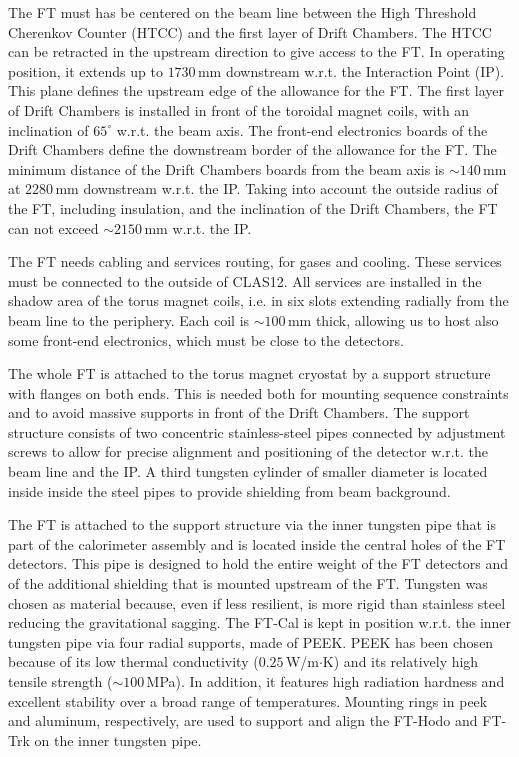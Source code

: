 The FT must has be centered on the beam line between the High Threshold Cherenkov Counter (HTCC) and the first layer of Drift Chambers. The HTCC can be retracted in the upstream direction to give access to the FT. In operating position, it extends up to $1730\,$mm downstream w.r.t. the Interaction Point (IP). This plane defines the upstream edge of the allowance for the FT. The first layer of Drift Chambers is installed in front of the toroidal magnet coils, with an inclination of $65^\circ$ w.r.t. the beam axis. The front-end electronics boards of the Drift Chambers define the downstream border of the allowance for the FT. The minimum distance of the Drift Chambers boards from the beam axis is $\sim140\,$mm at $2280\,$mm downstream w.r.t. the IP. Taking into account the outside radius of the FT, including insulation, and the inclination of the Drift Chambers, the FT can not exceed $\sim2150\,$mm w.r.t. the IP.

The FT needs cabling and services routing, for gases and cooling. These services must be connected to the outside of CLAS12. All services are installed in the shadow area of the torus magnet coils, i.e. in six slots extending radially from the beam line to the periphery. Each coil is  $\sim100\,$mm thick, allowing us to host also some front-end electronics, which must be close to the detectors.

The whole FT is attached to the torus magnet cryostat by a support structure with flanges on both ends. This is needed both for mounting sequence constraints and to avoid massive supports in front of the Drift Chambers.  The support structure consists of two concentric stainless-steel pipes connected by adjustment screws to allow for precise alignment and positioning of the detector w.r.t. the beam line and the IP. A third tungsten cylinder of smaller diameter is located inside inside the steel pipes to provide shielding from beam background. 

 The FT is attached to the support structure via the inner tungsten pipe that is part of the calorimeter assembly and is located inside the central holes of the FT detectors. This pipe is designed to hold the entire weight of the FT detectors and of the additional shielding that is mounted upstream of the FT. Tungsten was chosen as material because, even if less resilient, is more rigid than stainless steel reducing the gravitational sagging. The FT-Cal is kept in position w.r.t. the inner tungsten pipe via four radial supports, made of PEEK. PEEK has been chosen because of its low thermal conductivity ($0.25\,$W/m$\cdot$K) and its relatively high tensile strength ($\sim100\,$MPa). In addition, it features high radiation hardness and excellent stability over a broad range of temperatures. Mounting rings in peek and aluminum, respectively, are used to support and align the FT-Hodo and FT-Trk on the inner tungsten pipe.

